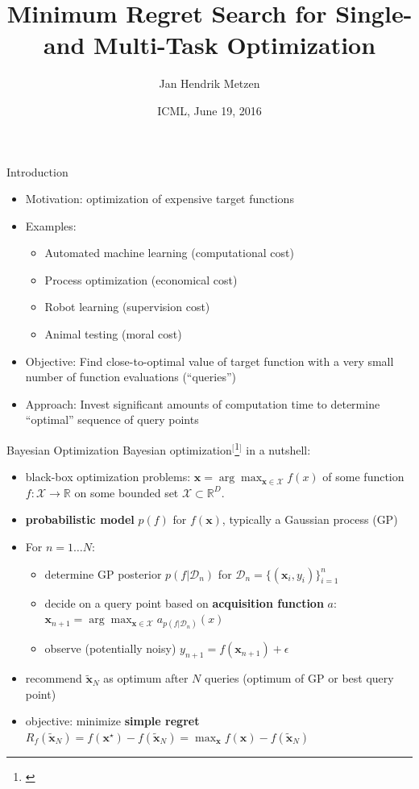 \documentclass[11pt]{beamer}
\title[ICML 2016]{Minimum Regret Search for Single- and Multi-Task Optimization}
\author[Jan Hendrik Metzen]{Jan Hendrik Metzen}
\institute[]{University Bremen, Robotics Research Group \\ Robert Bosch GmbH, Corporate Research CR/AEY2}
\date[06/19/16]{ICML, June 19, 2016}
\newcommand{\footcite}[1]{$^[$\footnote{\begin{tiny}\bibentry{#1}\end{tiny}}$^]$}
\renewcommand{\emph}[1]{\textbf{#1}}
\begin{document}

\begin{frame}{Introduction}

\begin{itemize}
  \item Motivation: optimization of expensive target functions
  \item Examples:
  \begin{itemize}
    \item Automated machine learning (computational cost)
    \item Process optimization (economical cost)
    \item Robot learning (supervision cost)
    \item Animal testing (moral cost)
  \end{itemize}
  \pause
  \item Objective: Find close-to-optimal value of target function with a very small number of function evaluations (``queries'')
  \pause
   \item Approach: Invest significant amounts of computation time to determine ``optimal'' sequence of query points
\end{itemize}
\vspace*{4cm}
\end{frame}

\begin{frame}{Bayesian Optimization}
Bayesian optimization\footcite{shahriari_taking_2016} in a nutshell:
\begin{itemize}
\item black-box optimization problems: $\mathbf{x} = \arg\max_{\mathbf{x} \in \mathcal{X}} f(x)$ of some function $f: \mathcal{X} \to \mathbb{R}$ on some bounded set $\mathcal{X} \subset \mathbb{R}^D$.
\item \emph{probabilistic model} $p(f)$ for $f(\mathbf{x})$, typically a Gaussian process (GP)
\pause
\item For $n=1\dots N$:
\begin{itemize}
   \item determine GP posterior $p(f\vert \mathcal{D}_n)$ for $\mathcal{D}_n=\{(\mathbf{x}_i, y_i)\}_{i=1}^n$ 
   \item decide on a query point based on \emph{acquisition function} $a$: $\mathbf{x}_{n+1} = \arg\max_{\mathbf{x} \in \mathcal{X}} a_{p(f\vert \mathcal{D}_n)}(x) $
\item observe (potentially noisy) $y_{n+1} = f(\mathbf{x}_{n+1}) + \epsilon$
\end{itemize}
\pause
\item recommend $\mathbf{\tilde x}_N$ as optimum  after $N$ queries (optimum of GP or best query point)
\item objective: minimize \emph{simple regret} 
$R_f(\mathbf{\tilde  x}_N) = f(\mathbf{x}^\star) - f(\mathbf{\tilde  x}_N) = \max_{\mathbf{x}} f(\mathbf{x}) - f(\mathbf{\tilde x}_N)$
\end{itemize}
\vspace*{2cm}
\end{frame}
\end{document}
